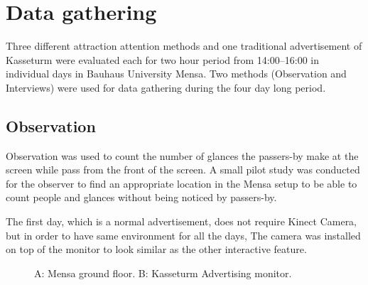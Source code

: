 \section{Data gathering}
Three different attraction attention methods and one traditional advertisement of Kasseturm were evaluated each for two hour period from 14:00--16:00 in individual days in Bauhaus University Mensa. Two methods (Observation and Interviews) were used for data gathering during the four day long period.

\subsection{Observation}
Observation was used to count the number of glances the passers-by make at the screen while pass from the front of the screen. A small pilot study was conducted for the observer to find an appropriate location in the Mensa setup to be able to count people and glances without being noticed by passers-by.

The first day, which is a normal advertisement, does not require Kinect Camera, but in order to have same environment for all the days, The camera was installed on top of the monitor to look similar as the other interactive feature.

\begin{figure}[!htb]
    \centering
    \hfill
    \caption{A: Mensa ground floor. B: Kasseturm Advertising monitor. }%
    \label{fig:observation_env}%
\end{figure}

